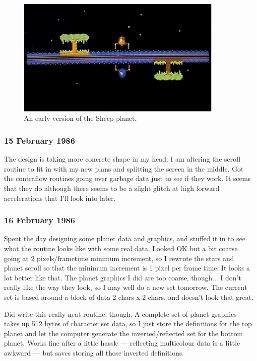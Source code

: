 \begin{figure}[H]
    \centering
      \includegraphics[width=10cm]{src/diary/zzap13_pic1.jpg}%
\caption{An early version of the Sheep planet.}
\end{figure}

\subsubsection{15 February 1986}
The design is taking more concrete shape in my head. I am altering the scroll routine to fit in with my new plans and splitting the screen in the middle. Got the contraflow routines going over garbage data just to see if they work. It seems that they do although there seems to be a slight glitch at high forward accelerations that I'll look into later.

\subsubsection{16 February 1986}
Spent the day designing some planet data and graphics, and stuffed it in to see what the routine looks like with some real data. Looked OK but a bit coarse going at 2 pixels/frametime minimum increment, so I rewrote the stars and planet scroll so that the minimum increment is 1 pixel per frame time. It looks a lot better like that. The planet graphics I did are too coarse, though... I don't really like the way they look, so I may well do a new set tomorrow. The current set is based around a block of data 2 chars x 2 chars, and doesn't look that great.

Did write this really neat routine, though. A complete set of planet graphics takes up 512 bytes of character set data, so I just store the definitions for the top planet and let the computer generate the inverted/reflected set for the bottom planet. Works fine after a little hassle — reflecting multicolour data is a little awkward — but saves storing all those inverted definitions.

